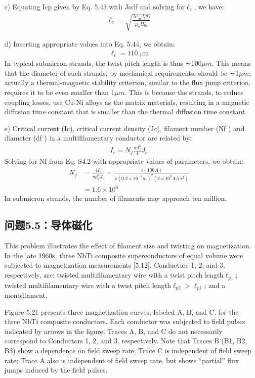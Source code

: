 c) Equating Icp given by Eq. 5.43 with Jcdf and solving for$\ell_c$, we have:
\begin{align*}%
\ell_{c}=\sqrt{\frac{2\rho_{cu}J_{c}d_{f}}{\mu_{o}\dot{H}_{0z}}}\tag{5.44}
\end{align*}

d) Inserting appropriate values into Eq. 5.44, we obtain:
\begin{align*}%
\ell_{c}=110\ \mathrm{\mu m}
\end{align*}
In typical submicron strands, the twist pitch length is thus ∼100$\mu m$. This means
that the diameter of such strands, by mechanical requirements, should be ∼1$\mu m$;
actually a thermal-magnetic stability criterion, similar to the flux jump criterion,
requires it to be even smaller than 1$\mu m$. This is because the strands, to reduce
coupling losses, use Cu-Ni alloys as the matrix materials, resulting in a magnetic
diffusion time constant that is smaller than the thermal diffusion time constant.

e) Critical current (Ic), critical current density (Jc), filament number (Nf ) and
diameter (df ) in a multifilamentary conductor are related by:
\begin{align*}%
I_c=N_f\frac{\pi d_f^2}{4} J_c \tag{S4.2}
\end{align*}
Solving for Nf from Eq. S4.2 with appropriate values of parameters, we obtain:
\begin{align*}%
N_{f}&=\frac{4I_{c}}{\pi d_{f}^{2}J_{c}}=\frac{4(100A)}{\pi(0.2\times10^{-6}m)^{2}(2\times10^{9}A/m^{2})}\\
&=1.6\times 10^{6}
\end{align*}
In submicron strands, the number of filaments may approach ten million.



\subsection{问题5.5：导体磁化}
This problem illustrates the effect of filament size and twisting on magnetization.
In the late 1960s, three NbTi composite superconductors of equal volume were
subjected to magnetization measurements [5.12]. Conductors 1, 2, and 3, respectively,
are: twisted multifilamentary wire with a twist pitch length$\ell_{p1}$; twisted
multifilamentary wire with a twist pitch length$\ell_{p2}>\ell_{p1}$; and a monofilament.


Figure 5.21 presents three magnetization curves, labeled A, B, and C, for the
three NbTi composite conductors. Each conductor was subjected to field pulses
indicated by arrows in the figure. Traces A, B, and C do not necessarily correspond
to Conductors 1, 2, and 3, respectively. Note that Traces B (B1, B2, B3) show a
dependence on field sweep rate; Trace C is independent of field sweep rate; Trace
A also is independent of field sweep rate, but shows “partial” flux jumps induced
by the field pulses.

